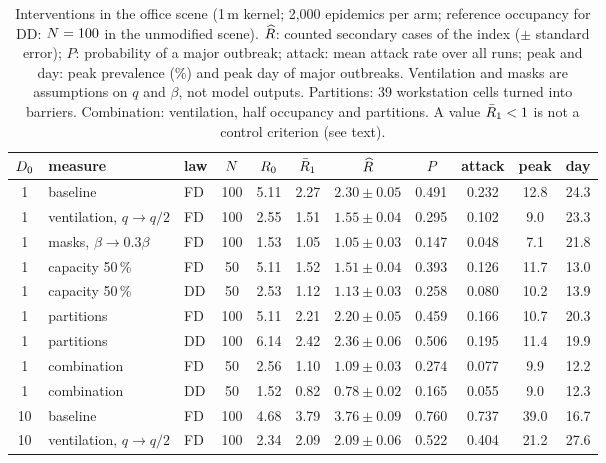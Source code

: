 \begin{table}[tbp]
  \centering\footnotesize\setlength{\tabcolsep}{4pt}
  \caption{Interventions in the office scene (1\,m kernel; 2,000 epidemics per arm; reference occupancy for DD:
  $N=100$ in the unmodified scene). $\widehat{R}$: counted secondary cases of the index ($\pm$ standard error);
  $P$: probability of a major outbreak; attack: mean attack rate over all runs; peak and day: peak prevalence
  (\%) and peak day of major outbreaks. Ventilation and masks are assumptions on $q$ and $\beta$, not model
  outputs. Partitions: 39 workstation cells turned into barriers. Combination: ventilation, half occupancy and
  partitions. A value $\bar{R}_1<1$ is not a control criterion (see text).}
  \label{s7_interventions:tab:interventions}
  \begin{tabular}{@{}cllcccccccc@{}}
    \toprule
    $D_0$ & measure & law & $N$ & $R_0$ & $\bar{R}_1$ & $\widehat{R}$ & $P$ & attack & peak & day \\
    \midrule
    1 & baseline & FD & 100 & 5.11 & 2.27 & $2.30\pm0.05$ & 0.491 & 0.232 & 12.8 & 24.3 \\
    1 & ventilation, $q\to q/2$ & FD & 100 & 2.55 & 1.51 & $1.55\pm0.04$ & 0.295 & 0.102 & 9.0 & 23.3 \\
    1 & masks, $\beta\to0.3\beta$ & FD & 100 & 1.53 & 1.05 & $1.05\pm0.03$ & 0.147 & 0.048 & 7.1 & 21.8 \\
    1 & capacity 50\,\% & FD & 50 & 5.11 & 1.52 & $1.51\pm0.04$ & 0.393 & 0.126 & 11.7 & 13.0 \\
    1 & capacity 50\,\% & DD & 50 & 2.53 & 1.12 & $1.13\pm0.03$ & 0.258 & 0.080 & 10.2 & 13.9 \\
    1 & partitions & FD & 100 & 5.11 & 2.21 & $2.20\pm0.05$ & 0.459 & 0.166 & 10.7 & 20.3 \\
    1 & partitions & DD & 100 & 6.14 & 2.42 & $2.36\pm0.06$ & 0.506 & 0.195 & 11.4 & 19.9 \\
    1 & combination & FD & 50 & 2.56 & 1.10 & $1.09\pm0.03$ & 0.274 & 0.077 & 9.9 & 12.2 \\
    1 & combination & DD & 50 & 1.52 & 0.82 & $0.78\pm0.02$ & 0.165 & 0.055 & 9.0 & 12.3 \\
    \midrule
    10 & baseline & FD & 100 & 4.68 & 3.79 & $3.76\pm0.09$ & 0.760 & 0.737 & 39.0 & 16.7 \\
    10 & ventilation, $q\to q/2$ & FD & 100 & 2.34 & 2.09 & $2.09\pm0.06$ & 0.522 & 0.404 & 21.2 & 27.6 \\

\end{tabular}
\end{table}
